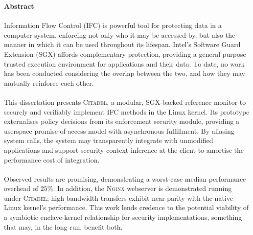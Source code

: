 \newpage
{\Huge \bf Abstract}
\vspace{24pt} 


\paragraph{} Information Flow Control (IFC) is powerful tool for protecting data in a computer system, enforcing not only who it may be accessed by, but also the manner in which it can be used throughout its lifespan. Intel's Software Guard Extension (SGX) affords complementary protection, providing a general purpose trusted execution environment for applications and their data. To date, no work has been conducted considering the overlap between the two, and how they may mutually reinforce each other.

\paragraph{} This dissertation presents \textsc{Citadel}, a modular, SGX-backed reference monitor to securely and verifiably implement IFC methods in the Linux kernel. Its prototype externalises policy decisions from its enforcement security module, providing a userspace promise-of-access model with asynchronous fulfillment. By aliasing system calls, the system may transparently integrate with unmodified applications and support security context inference at the client to amortise the performance cost of integration. 

\paragraph{} Observed results are promising, demonstrating a worst-case median performance overhead of $25\%$. In addition, the \textsc{Nginx} webserver is demonstrated running under \textsc{Citadel}; high bandwidth transfers exhibit near parity with the native Linux kernel's performance. This work lends credence to the potential viability of a symbiotic enclave-kernel relationship for security implementations, something that may, in the long run, benefit both.




\newpage
\vspace*{\fill}
